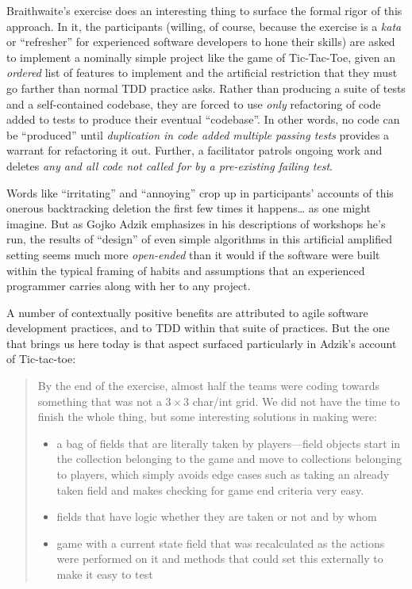Braithwaite's exercise does an interesting thing to surface the formal rigor of this approach. In it, the participants (willing, of course, because the exercise is a \emph{kata} or ``refresher'' for experienced software developers to hone their skills) are asked to implement a nominally simple project like the game of Tic-Tac-Toe, given an \emph{ordered} list of features to implement and the artificial restriction that they must go farther than normal TDD practice asks. Rather than producing a suite of tests and a self-contained codebase, they are forced to use \emph{only} refactoring of code added to tests to produce their eventual ``codebase''. In other words, no code can be ``produced'' until \emph{duplication in code added multiple passing tests} provides a warrant for refactoring it out. Further, a facilitator patrols ongoing work and deletes \emph{any and all code not called for by a pre-existing failing test}.

Words like ``irritating'' and ``annoying'' crop up in participants' accounts of  this onerous backtracking deletion the first few times it happens\ldots{} as one might imagine. But as Gojko Adzik emphasizes in his descriptions of workshops he's run, the results of ``design'' of even simple algorithms in this artificial amplified setting seems much more \emph{open-ended} than it would if the software were built within the typical framing of habits and assumptions that an experienced programmer carries along with her to any project.

A number of contextually positive benefits are attributed to agile software development practices, and to TDD within that suite of practices. But the one that brings us here today is that aspect surfaced particularly in Adzik's account of Tic-tac-toe:

\begin{quotation}
By the end of the exercise, almost half the teams were coding towards something that was not a $3\times 3$ char/int grid. We did not have the time to finish the whole thing, but some interesting solutions in making were:

\begin{itemize}
\item a bag of fields that are literally taken by players---field objects start in the collection belonging to the game and move to collections belonging to players, which simply avoids edge cases such as taking an already taken field and makes checking for game end criteria very easy.
\item fields that have logic whether they are taken or not and by whom
\item game with a current state field that was recalculated as the actions were performed on it and methods that could set this externally to make it easy to test
\end{itemize}
\end{quotation}


